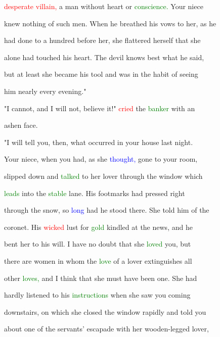  \textcolor{red}{desperate} \textcolor{red}{villain,} a man without heart or \textcolor{green}{conscience.} Your niece

 knew nothing of such men. When he breathed his \textcolor{BurntOrange}{vows} to her, as he

 had done to a hundred before her, she flattered herself that she

 alone had touched his heart. The \textcolor{BurntOrange}{devil} knows best what he said,

 but at least she became his tool and was in the habit of seeing

 him nearly every evening."



 "I cannot, and I will not, believe it!" \textcolor{red}{cried} the \textcolor{green}{banker} with an

 ashen face.



 "I will tell you, then, what occurred in your house last night.

 Your niece, when you had, as she \textcolor{blue}{thought,} gone to your room,

 \textcolor{BurntOrange}{slipped} down and \textcolor{green}{talked} to her \textcolor{BurntOrange}{lover} through the window which

 \textcolor{green}{leads} into the \textcolor{green}{stable} lane. His footmarks had pressed right

 through the snow, so \textcolor{blue}{long} had he stood there. She told him of the

 coronet. His \textcolor{red}{wicked} \textcolor{BurntOrange}{lust} for \textcolor{green}{gold} kindled at the news, and he

 bent her to his will. I have no \textcolor{BurntOrange}{doubt} that she \textcolor{green}{loved} you, but

 there are women in whom the \textcolor{green}{love} of a \textcolor{BurntOrange}{lover} extinguishes all

 other \textcolor{green}{loves,} and I think that she must have been one. She had

 hardly listened to his \textcolor{green}{instructions} when she saw you coming

 downstairs, on which she closed the window rapidly and told you

 about one of the \textcolor{BurntOrange}{servants'} escapade with her wooden-legged \textcolor{BurntOrange}{lover,}

